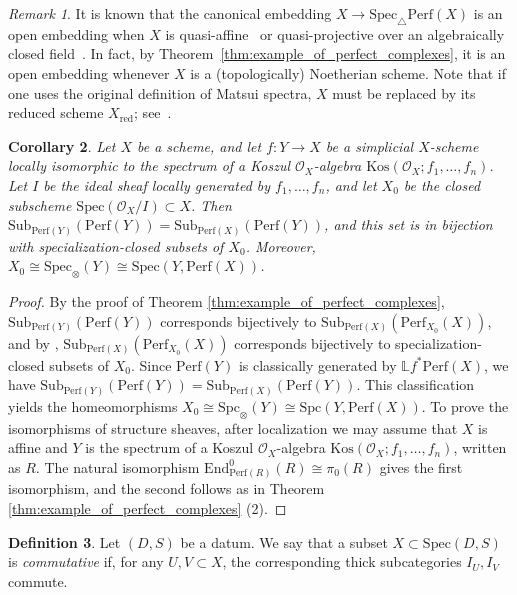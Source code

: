 \documentclass[11pt]{amsart}
\theoremstyle{definition}
\newtheorem{defn}{Definition}[section]
\theoremstyle{plain}
\newtheorem{cor}[defn]{Corollary}
\theoremstyle{remark}
\newtheorem{rem}[defn]{Remark}
\newcommand{\perf}{\mathrm{Perf}}
\newcommand{\Spec}{\mathrm{Spec}}
\newcommand{\Sub}{\mathrm{Sub}}
\newcommand{\tSpec}{\mathrm{Spec}_{\triangle}}
\newcommand{\mo}{\mathrm}
\newcommand{\sO}{\mathscr{O}}
\newcommand{\ld}{\mathbb{L}}
\newcommand{\End}{\mathrm{End}}
\newcommand{\oSpec}{\mathrm{Spec}_{\otimes}}
\newcommand{\Spc}{\mathrm{Spc}}
\newcommand{\oSpc}{\mathrm{Spc}_{\otimes}}
\numberwithin{equation}{section}
\begin{document}
\begin{rem}
It is known that the canonical embedding \(X \to \tSpec\perf(X)\) is an open embedding when \(X\) is quasi-affine~\cite[Corollary~4.7]{Ma2} or quasi-projective over an algebraically closed field~\cite[Theorem~3.2]{IM}.  
In fact, by Theorem~\ref{thm:example_of_perfect_complexes}, it is an open embedding whenever \(X\) is a (topologically) Noetherian scheme.  
Note that if one uses the original definition of Matsui spectra, \(X\) must be replaced by its reduced scheme \(X_{\mo{red}}\); see~\cite{Ma2}.
\end{rem}


\begin{cor}
  Let \(X\) be a scheme, and let \(f:Y\to X\) be a simplicial \(X\)-scheme locally isomorphic to the spectrum of a Koszul \(\sO_X\)-algebra \(\mo{Kos}(\sO_X;f_1,\ldots,f_n)\).
  Let \(I\) be the ideal sheaf locally generated by \(f_1,\ldots,f_n\), and let \(X_0\) be the closed subscheme \(\Spec(\sO_X/I)\subset X\).
  Then \(\Sub_{\perf(Y)}(\perf(Y))=\Sub_{\perf(X)}(\perf(Y))\), and this set is in bijection with specialization-closed subsets of \(X_0\).
  Moreover, \(X_0\cong \oSpec(Y)\cong \Spec(Y,\perf(X))\).
\end{cor}
\begin{proof}
By the proof of Theorem \ref{thm:example_of_perfect_complexes}, \(\Sub_{\perf(Y)}(\perf(Y))\) corresponds bijectively to \(\Sub_{\perf(X)}(\perf_{X_0}(X))\), and by \cite[Theorem 3.15]{Th}, \(\Sub_{\perf(X)}(\perf_{X_0}(X))\) corresponds bijectively to specialization-closed subsets of \(X_0\).
Since \(\perf(Y)\) is classically generated by \(\ld f^*\perf(X)\), we have \(\Sub_{\perf(Y)}(\perf(Y))=\Sub_{\perf(X)}(\perf(Y))\).
This classification yields the homeomorphisms \(X_0\cong \oSpc(Y)\cong \Spc(Y,\perf(X))\).
To prove the isomorphisms of structure sheaves, after localization we may assume that \(X\) is affine and \(Y\) is the spectrum of a Koszul \(\sO_X\)-algebra \(\mo{Kos}(\sO_X;f_1,\ldots,f_n)\), written as \(R\).
The natural isomorphism \(\End^0_{\perf(R)}(R)\cong \pi_0(R)\) gives the first isomorphism, and the second follows as in Theorem \ref{thm:example_of_perfect_complexes} (2).
\end{proof}

\begin{defn}
Let \((D,S)\) be a datum.
We say that a subset \(X\subset \Spec(D,S)\) is \emph{commutative} if, for any \(U,V\subset X\), the corresponding thick subcategories \(I_U,I_V\) commute.
\end{defn}
\end{document}
